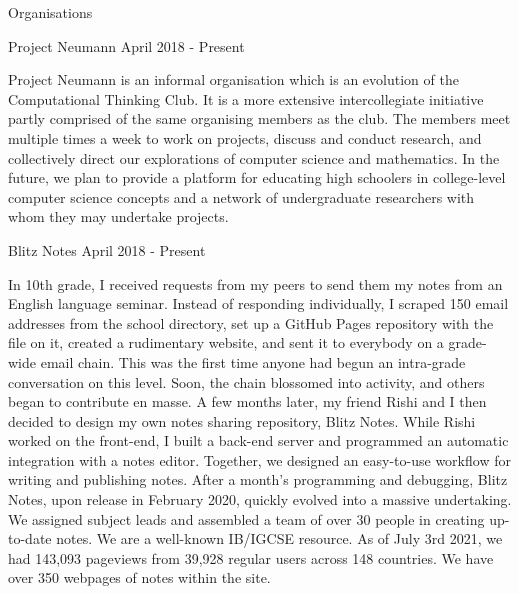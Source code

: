 \documentclass{resume} %
\begin{document}
\begin{rSection}{Organisations}


\begin{rSubsection}{ Project Neumann }{ April 2018 - Present }{}
\item Project Neumann is an informal organisation which is an evolution of the Computational Thinking Club. It is a more extensive intercollegiate initiative partly comprised of the same organising members as the club. The members meet multiple times a week to work on projects, discuss and conduct research, and collectively direct our explorations of computer science and mathematics. In the future, we plan to provide a platform for educating high schoolers in college-level computer science concepts and a network of undergraduate researchers with whom they may undertake projects.

\end{rSubsection}



\begin{rSubsection}{ Blitz Notes }{ April 2018 - Present }{}
\item In 10th grade, I received requests from my peers  to send them my notes from an English language seminar. Instead of responding individually, I scraped 150 email addresses from the school directory, set up a GitHub Pages repository with the file on it, created a rudimentary website, and sent it to everybody on a grade-wide email chain.      This was the first time anyone had begun an intra-grade conversation on this level. Soon, the chain blossomed into activity, and others began to contribute en masse.      A few months later, my friend Rishi and I then decided to design my own notes sharing repository, Blitz Notes.      While Rishi worked on the front-end, I built a back-end server and programmed an automatic integration with a notes editor. Together, we designed an easy-to-use workflow for writing and publishing notes. After a month’s programming and debugging, Blitz Notes, upon release in February 2020, quickly evolved into a massive undertaking. We assigned subject leads and assembled a team of over 30 people in creating up-to-date notes. We are a well-known IB/IGCSE resource. As of July 3rd 2021, we had 143,093 pageviews from 39,928 regular users across 148 countries. We have over 350 webpages of notes within the site.      

\end{rSubsection}




\end{rSection}
\end{document}
